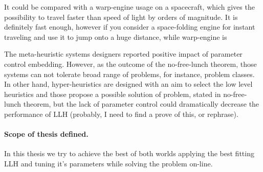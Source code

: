 

It could be compared with a warp-engine usage on a spacecraft, which gives the possibility to travel faster than speed of light by orders of magnitude. It is definitely fast enough, however if you consider a space-folding engine for instant traveling and use it to jump onto a huge distance, while warp-engine is 


The meta-heuristic systems designers reported positive impact of parameter control embedding. 
However, as the outcome of the no-free-lunch theorem, those systems can not tolerate broad range of problems, for instance, problem classes.
In other hand, hyper-heuristics are designed with an aim to select the low level heuristics and those propose a possible solution of problem, stated in no-free-lunch theorem, but the lack of parameter control could dramatically decrease the performance of LLH (probably, I need to find a prove of this, or rephrase).

\paragraph{Scope of thesis defined.} In this thesis we try to achieve the best of both worlds applying the best fitting LLH and tuning it's parameters while solving the problem on-line.